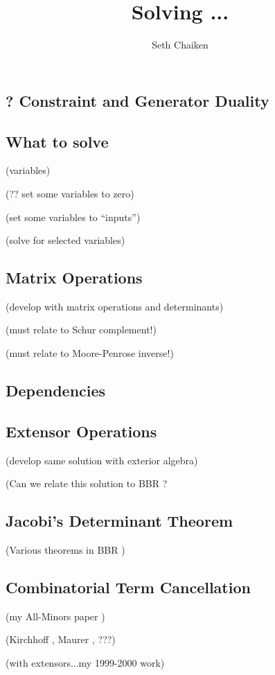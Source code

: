 \documentclass{article}
\title{Solving ... }
\author{Seth Chaiken}
\begin{document}
\maketitle
\subsection{? Constraint and Generator Duality}


\subsection{What to solve}

(variables) ~\cite{OMBOOK}

(?? set some variables to zero)

(set some variables to ``inputs'')

(solve for selected variables) 

\subsection{Matrix Operations}

(develop with matrix operations and determinants)


(must relate to Schur complement!)

(must relate to Moore-Penrose inverse!)

\subsection{Dependencies}
\subsection{Extensor Operations}

(develop same solution with exterior algebra)

(Can we relate this solution to BBR \cite{exteriorCalc}?


\subsection{Jacobi's Determinant Theorem}

(Various theorems in 
BBR \cite{exteriorCalc})

\subsection{Combinatorial Term Cancellation}

(my All-Minors paper \cite{sdcMTT} )

(Kirchhoff \cite{Kirchhoff}, Maurer \cite{Maurer76}, ???)

(with extensors...my 1999-2000 work)

{}

\end{document}
